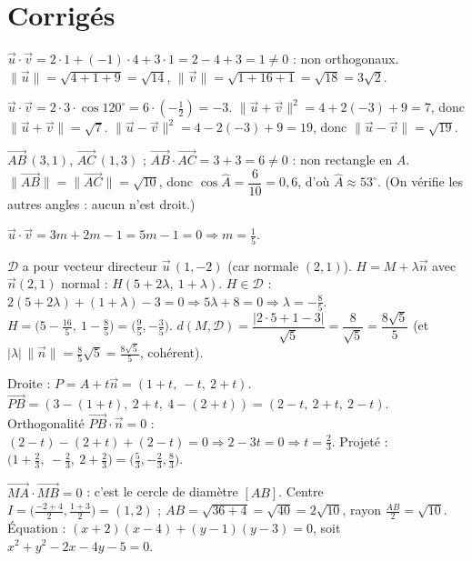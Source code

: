 \section{Corrigés}

$\vec u\cdot\vec v=2\cdot1+(-1)\cdot4+3\cdot1=2-4+3=1\neq0$ : non orthogonaux.
$\|\vec u\|=\sqrt{4+1+9}=\sqrt{14}$, $\|\vec v\|=\sqrt{1+16+1}=\sqrt{18}=3\sqrt2$.

$\vec u\cdot\vec v=2\cdot3\cdot\cos120^\circ=6\cdot(-\tfrac12)=-3$.
$\|\vec u+\vec v\|^{2}=4+2(-3)+9=7$, donc $\|\vec u+\vec v\|=\sqrt7$.
$\|\vec u-\vec v\|^{2}=4-2(-3)+9=19$, donc $\|\vec u-\vec v\|=\sqrt{19}$.

$\overrightarrow{AB}\,(3,1)$, $\overrightarrow{AC}\,(1,3)$ ;
$\overrightarrow{AB}\cdot\overrightarrow{AC}=3+3=6\neq0$ : non rectangle en $A$.
$\|\overrightarrow{AB}\|=\|\overrightarrow{AC}\|=\sqrt{10}$, donc
$\cos\widehat A=\dfrac{6}{10}=0{,}6$, d'où $\widehat A\approx 53^\circ$.
(On vérifie les autres angles : aucun n'est droit.)

$\vec u\cdot\vec v=3m+2m-1=5m-1=0\Rightarrow m=\tfrac15$.

$\mathcal D$ a pour vecteur directeur $\vec u\,(1,-2)$ (car normale $(2,1)$).
$H=M+\lambda\vec n$ avec $\vec n(2,1)$ normal : $H(5+2\lambda,\ 1+\lambda)$.
$H\in\mathcal D$ : $2(5+2\lambda)+(1+\lambda)-3=0\Rightarrow 5\lambda+8=0\Rightarrow\lambda=-\tfrac85$.
$H=\big(5-\tfrac{16}5,\ 1-\tfrac85\big)=\big(\tfrac95,-\tfrac35\big)$.
$d(M,\mathcal D)=\dfrac{|2\cdot5+1-3|}{\sqrt5}=\dfrac{8}{\sqrt5}=\dfrac{8\sqrt5}5$
(et $|\lambda|\,\|\vec n\|=\tfrac85\sqrt5=\tfrac{8\sqrt5}5$, cohérent).

Droite : $P=A+t\vec n=(1+t,\ -t,\ 2+t)$. $\overrightarrow{PB}=(3-(1+t),\ 2+t,\ 4-(2+t))=(2-t,\ 2+t,\ 2-t)$.
Orthogonalité $\overrightarrow{PB}\cdot\vec n=0$ : $(2-t)-(2+t)+(2-t)=0\Rightarrow 2-3t=0\Rightarrow t=\tfrac23$.
Projeté : $\big(1+\tfrac23,\ -\tfrac23,\ 2+\tfrac23\big)=\big(\tfrac53,-\tfrac23,\tfrac83\big)$.

$\overrightarrow{MA}\cdot\overrightarrow{MB}=0$ : c'est le cercle de diamètre $[AB]$.
Centre $I=\big(\tfrac{-2+4}2,\tfrac{1+3}2\big)=(1,2)$ ; $AB=\sqrt{36+4}=\sqrt{40}=2\sqrt{10}$,
rayon $\tfrac{AB}2=\sqrt{10}$. Équation : $(x+2)(x-4)+(y-1)(y-3)=0$, soit
$x^{2}+y^{2}-2x-4y-5=0$.

